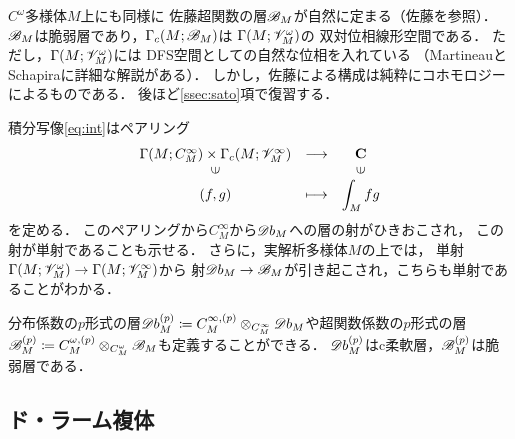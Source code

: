 \(C^\omega\)多様体\(M\)上にも同様に
佐藤超関数の層\(\mathscr{B}_M\)が自然に定まる（佐藤\cite{Sa59}を参照）．
\(\mathscr{B}_M\)は脆弱層であり，\(\Gamma_c(M;\mathscr{B}_M)\)は
\(\Gamma(M;\mathscr{V}_M^\omega)\)の
双対位相線形空間である．
ただし，\(\Gamma(M;\mathscr{V}_M^\omega)\)には
DFS空間としての自然な位相を入れている
（MartineauとSchapiraに詳細な解説がある）．
しかし，佐藤による構成は純粋にコホモロジーによるものである．
後ほど\ref{ssec:sato}項で復習する．

積分写像\eqref{eq:int}はペアリング
\begin{equation}
    \begin{array}{ccc}
        {\Gamma(M;C_M^\infty)\times\Gamma_c(M;\scV_M^\infty)}&\longrightarrow&\cc\\
        \rotatebox{90}{$\in$}&&\rotatebox{90}{$\in$}\\
        (f,g)&\longmapsto&\dip\int_Mfg
    \end{array}
\end{equation}
を定める．
このペアリングから\(C^\infty_M\)から\(\mathord{\mathscr{D}b}_M\)への層の射がひきおこされ，
この射が単射であることも示せる．
さらに，実解析多様体\(M\)の上では，
単射\(\Gamma(M;\mathscr{V}_M^\omega)\to\Gamma(M;\mathscr{V}_M^\infty)\)から
射\(\mathord{\mathscr{D}b}_M\to\mathscr{B}_M\)が引き起こされ，こちらも単射であることがわかる．

分布係数の\(p\)形式の層\(
    \mathord{\mathscr{D}b}_M^{(p)}
    \coloneqq 
    C^{\infty,(p)}_M\otimes_{C^\infty_M}\mathord{\mathscr{D}b}_M
\)や超関数係数の\(p\)形式の層\(
    \mathscr{B}_M^{(p)}
    \coloneqq 
    C^{\omega,(p)}_M\otimes_{C^\omega_M}\mathscr{B}_M
\)も定義することができる．
\(\mathord{\mathscr{D}b}_M^{(p)}\)はc柔軟層，\(\mathscr{B}_M^{(p)}\)は脆弱層である．


\subsection{ド・ラーム複体}

